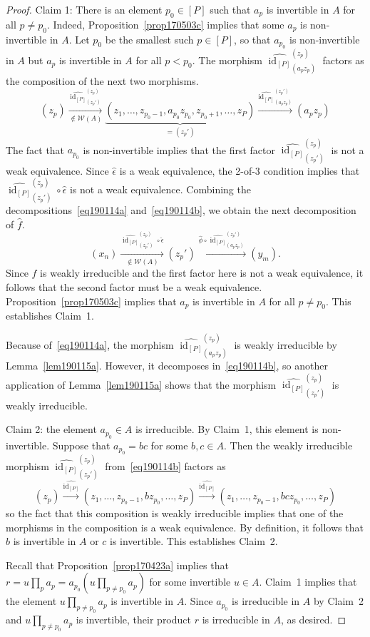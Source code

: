 \documentclass[reqno]{amsart}
\theoremstyle{plain}
\theoremstyle{definition}
\newcommand{\cat}[1]{\mathcal{#1}}
\newcommand{\catw}{\cat{W}}
\newcommand{\id}{\operatorname{id}}
\newcommand{\xra}{\xrightarrow}
\numberwithin{equation}{lem}
\begin{document}
\begin{proof}
Claim 1: There is an element $p_0\in [P]$ such that $a_p$ is invertible in $A$ for all $p\neq p_0$.
Indeed, Proposition~\ref{prop170503c} implies that some $a_p$ is non-invertible in $A$.
Let $p_0$ be the smallest such $p\in[P]$, so that $a_{p_0}$ is non-invertible in $A$ but $a_p$ is invertible in $A$ for all $p<p_0$.
The morphism $\widehat{\id_{[P]}}^{(z_p)}_{(a_pz_p)}$ factors as 
the composition of the next two morphisms.
\begin{equation}\label{eq190114b}
(z_p)\xra[\notin\catw(A)]{\widehat{\id_{[P]}}^{(z_p)}_{(z_p')}}
\underbrace{(z_1,\ldots,z_{p_0-1},a_{p_0}z_{p_0},z_{p_0+1},\ldots,z_P)}_{=(z_p')}
\xra{\widehat{\id_{[P]}}^{(z_p')}_{(a_pz_p)}}(a_pz_p)
\end{equation}
The fact that $a_{p_0}$ is non-invertible implies that the first factor $\widehat{\id_{[P]}}^{(z_p)}_{(z_p')}$ is not a weak equivalence. 
Since $\hat\epsilon$ is a weak equivalence, the 2-of-3 condition implies that $\widehat{\id_{[P]}}^{(z_p)}_{(z_p')}\circ\hat\epsilon$ is
not a weak equivalence. Combining the decompositions~\eqref{eq190114a} and~\eqref{eq190114b}, we obtain the next decomposition of $\hat f$.
$$(x_n)\xra[\notin\catw(A)]{\widehat{\id_{[P]}}^{(z_p)}_{(z_p')}\circ\hat\epsilon}(z_p')\xra{\hat\phi\circ\widehat{\id_{[P]}}^{(z_p')}_{(a_pz_p)}}(y_m).$$
Since $\hat f$ is weakly irreducible and the first factor here is not a weak equivalence, it follows that the second factor must be a weak
equivalence. Proposition~\ref{prop170503c} implies that $a_p$ is invertible in $A$ for all $p\neq p_0$.
This establishes Claim~1.

Because of~\eqref{eq190114a}, the morphism $\widehat{\id_{[P]}}^{(z_p)}_{(a_pz_p)}$ is weakly irreducible by Lemma~\ref{lem190115a}.
However, it decomposes in~\eqref{eq190114b}, so another application of Lemma~\ref{lem190115a} shows that the morphism
$\widehat{\id_{[P]}}^{(z_p)}_{(z_p')}$ is weakly irreducible.

Claim 2: the element $a_{p_0}\in A$ is irreducible. By Claim~1, this element is non-invertible.
Suppose that $a_{p_0}=bc$ for some $b,c\in A$.
Then the weakly irreducible morphism $\widehat{\id_{[P]}}^{(z_p)}_{(z_p')}$ from~\eqref{eq190114b} factors as 
$$(z_p) \xra{\widehat{\id_{[P]}}} (z_1,\ldots,z_{p_0-1},bz_{p_0},\ldots,z_P)\xra{\widehat{\id_{[P]}}} 
(z_1,\ldots,z_{p_0-1},bcz_{p_0},\ldots,z_P)$$
so the fact that this composition is 
weakly
irreducible implies that
one of the morphisms in the composition
is a weak equivalence.
By definition, it follows that $b$ is invertible in $A$ or $c$ is invertible. This establishes Claim~2.


Recall that Proposition~\ref{prop170423a} implies that $r=u\prod_pa_p=a_{p_0}(u\prod_{p\neq p_0}a_p)$ for some invertible $u\in A$.
Claim~1 implies that the element $u\prod_{p\neq p_0}a_p$ is invertible in $A$.
Since $a_{p_0}$ is irreducible in $A$ by Claim~2 and $u\prod_{p\neq p_0}a_p$ is invertible, their product $r$ is irreducible in $A$, as desired.
\end{proof}
\end{document}

